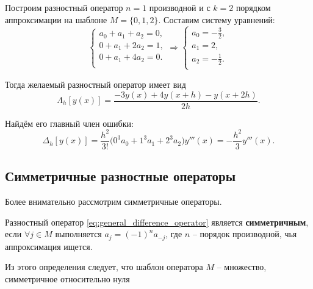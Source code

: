 \documentclass[../main.tex]{subfile}
\begin{document}
\begin{example}
	Построим разностный оператор $n=1$ производной и с $k=2$ порядком
	аппроксимации на шаблоне $M=\{0,1,2\}$. Составим систему уравнений:
	\begin{equation*}
		\begin{cases}
			a_0+a_1+a_2=0, \\
			0+a_1+2a_2=1, \\
			0+a_1+4a_2=0. \\
		\end{cases}
		\Rightarrow
		\begin{cases}
			a_0 = -\frac{3}{2}, \\
			a_1 = 2, \\
			a_2 = -\frac{1}{2}. \\
		\end{cases}
	\end{equation*}

	Тогда желаемый разностный оператор имеет вид
	\[\Lambda_h[y(x)]=\frac{-3y(x)+4y(x+h)-y(x+2h)}{2h}.\]

	Найдём его главный член ошибки:
	\[\Delta_h[y(x)]=\frac{h^2}{3!}\big(0^3a_0+1^3a_1+2^3a_2\big)y'''(x)=
	-\frac{h^2}{3}y'''(x).\]
\end{example}

\subsection{Симметричные разностные операторы}
Более внимательно рассмотрим симметричные операторы.

\begin{define}\label{eq:central_difference_operator}
	Разностный оператор \eqref{eq:general_difference_operator} является
	\textbf{симметричным}, если $\forall j\in M$ выполняется
	$a_j=(-1)^na_{-j}$, где $n$ -- порядок производной, чья аппроксимация
	ищется.
\end{define}

Из этого определения следует, что шаблон оператора $M$ -- множество,
симметричное относительно нуля
\end{document}
